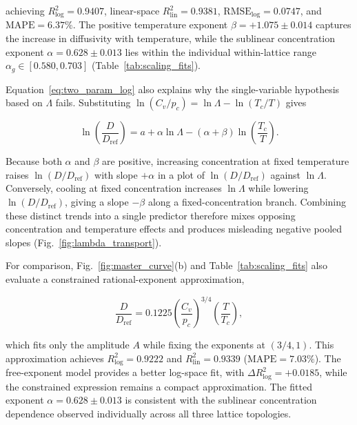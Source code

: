 \documentclass[aps,pre,reprint,superscriptaddress,amsmath,amssymb,floatfix]{revtex4-2}
\begin{document}
achieving $R^2_{\log} = 0.9407$, linear-space $R^2_{\mathrm{lin}} = 0.9381$, $\mathrm{RMSE}_{\log} = 0.0747$, and $\mathrm{MAPE} = 6.37\%$. The positive temperature exponent $\beta = +1.075 \pm 0.014$ captures the increase in diffusivity with temperature, while the sublinear concentration exponent $\alpha = 0.628 \pm 0.013$ lies within the individual within-lattice range $\alpha_g \in [0.580,0.703]$ (Table~\ref{tab:scaling_fits}).

Equation~\eqref{eq:two_param_log} also explains why the single-variable hypothesis based on $\Lambda$ fails. Substituting $\ln(C_v/p_c) = \ln\Lambda - \ln(T_c/T)$ gives

\begin{equation}
\ln\!\left(\frac{D}{D_{\mathrm{ref}}}\right)
=
a + \alpha\ln\Lambda
-(\alpha+\beta)\ln\!\left(\frac{T_c}{T}\right).
\label{eq:lambda_identity}
\end{equation}

Because both $\alpha$ and $\beta$ are positive, increasing concentration at fixed temperature raises $\ln(D/D_{\mathrm{ref}})$ with slope $+\alpha$ in a plot of $\ln(D/D_{\mathrm{ref}})$ against $\ln\Lambda$. Conversely, cooling at fixed concentration increases $\ln\Lambda$ while lowering $\ln(D/D_{\mathrm{ref}})$, giving a slope $-\beta$ along a fixed-concentration branch. Combining these distinct trends into a single predictor therefore mixes opposing concentration and temperature effects and produces misleading negative pooled slopes (Fig.~\ref{fig:lambda_transport}).

For comparison, Fig.~\ref{fig:master_curve}(b) and Table~\ref{tab:scaling_fits} also evaluate a constrained rational-exponent approximation,

\begin{equation}
\frac{D}{D_{\mathrm{ref}}}
=
0.1225
\left(\frac{C_v}{p_c}\right)^{3/4}
\left(\frac{T}{T_c}\right),
\label{eq:master_scaling}
\end{equation}

which fits only the amplitude $A$ while fixing the exponents at $(3/4,1)$. This approximation achieves $R^2_{\log} = 0.9222$ and $R^2_{\mathrm{lin}} = 0.9339$ ($\mathrm{MAPE} = 7.03\%$). The free-exponent model provides a better log-space fit, with $\Delta R^2_{\log} = +0.0185$, while the constrained expression remains a compact approximation. The fitted exponent $\alpha = 0.628 \pm 0.013$ is consistent with the sublinear concentration dependence observed individually across all three lattice topologies.
\end{document}
